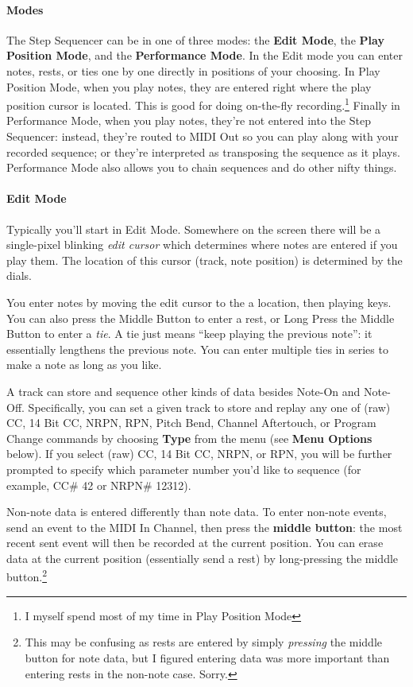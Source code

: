 \documentclass{article}
\begin{document}
\paragraph{Modes} The Step Sequencer can be in one of three modes: the {\bf Edit Mode}, the {\bf Play Position Mode}, and the {\bf Performance Mode}.  In the Edit mode you can enter notes, rests, or ties one by one directly in positions of your choosing.  In Play Position Mode, when you play notes, they are entered right where the play position cursor is located.  This is good for doing on-the-fly recording.\footnote{I myself spend most of my time in Play Position Mode}  Finally in Performance Mode, when you play notes, they're not entered into the Step Sequencer: instead, they're routed to MIDI Out so you can play along with your recorded sequence; or they're interpreted as transposing the sequence as it plays.  Performance Mode also allows you to chain sequences and do other nifty things.

\paragraph{Edit Mode}
Typically you'll start in Edit Mode.  Somewhere on the screen there will be a single-pixel blinking {\it edit cursor} which determines where notes are entered if you play them.  The location of this cursor (track, note position) is determined by the dials.  

You enter notes by moving the edit cursor to the a location, then playing keys.  You can also press the Middle Button to enter a rest, or Long Press the Middle Button to enter a {\it tie}.  A tie just means ``keep playing the previous note'': it essentially lengthens the previous note.  You can enter multiple ties in series to make a note as long as you like.

A track can store and sequence other kinds of data besides Note-On and Note-Off.  Specifically, you can set a given track to store and replay any one of (raw) CC, 14 Bit CC, NRPN, RPN, Pitch Bend, Channel Aftertouch, or Program Change commands by choosing {\bf Type} from the menu (see {\bf Menu Options} below).  If you select (raw) CC, 14 Bit CC, NRPN, or RPN, you will be further prompted to specify which parameter number you'd like to sequence (for example, CC\# 42 or NRPN\# 12312).

Non-note data is entered differently than note data.  To enter non-note events, send an event to the MIDI In Channel, then press the {\bf middle button}: the most recent sent event will then be recorded at the current position.  You can erase data at the current position (essentially send a rest) by long-pressing the middle button.\footnote{This may be confusing as rests are entered by simply {\it pressing} the middle button for note data, but I figured entering data was more important than entering rests in the non-note case.  Sorry.}
\end{document}
